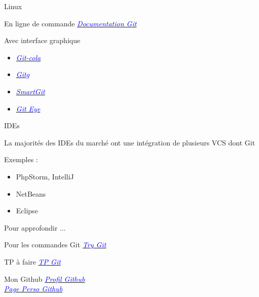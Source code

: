   \begin{frame}{Linux}
  
    \begin{block}{En ligne de commande}
    {
      \href{http://git-scm.com/book/fr/}{\textit{\textcolor{blue}{Documentation Git}}}
    }
    \end{block}
      
    \begin{block}{Avec interface graphique} 
    {
      \begin{itemize}
	\item<2>{\href{http://git-cola.github.io/}{\textit{\textcolor{blue}{Git-cola}}}} 	\item<3>{\href{https://wiki.gnome.org/action/show/Apps/Gitg?action=show&redirect=Gitg}{\textit{\textcolor{blue}{Gitg}}}}
	\item<4>{\href{http://www.syntevo.com/smartgithg/}{\textit{\textcolor{blue}{SmartGit}}}}
	\item<5>{\href{http://www.collab.net/giteyeapp}{\textit{\textcolor{blue}{Git Eye}}}} 
      \end{itemize}
    }
    \end{block}
    
  \end{frame}
  
  \begin{frame}{IDEs}
  
    La majorit\'es des IDEs du march\'e ont une int\'egration de plusieurs VCS dont Git
    
    {
      \begin{exampleblock}{Exemples :}
	\begin{itemize}
	\item PhpStorm, IntelliJ
	\item NetBeans
	\item Eclipse
	\end{itemize}
      \end{exampleblock}
    }
  \end{frame}
  
  \begin{frame}{Pour approfondir ...}
  
	  \begin{block}{Pour les commandes Git}
		  \href{http://try.github.io/}{\textit{\textcolor{blue}{Try Git}}}
	  \end{block}
	  
	  \begin{block}{TP à faire}
		  \href{http://bit.ly/iut-3}{\textit{\textcolor{blue}{TP Git}}}
	  \end{block}
	  
	  \begin{block}{Mon Github}
	    \href{http://github.com/hadeli}{\textit{\textcolor{blue}{Profil Github}}}\\
	    \href{http://hadeli.github.io}{\textit{\textcolor{blue}{Page Perso Github}}}
	  \end{block}
	  
  \end{frame}
